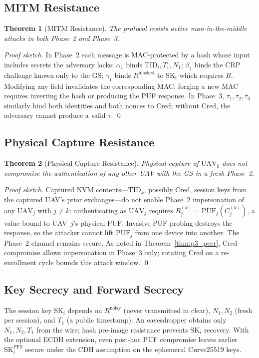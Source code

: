 \documentclass[journal,a4paper,10pt]{IEEEtran}
\newtheorem{theorem}{Theorem}
\begin{document}
\subsection{MITM Resistance}
\begin{theorem}[MITM Resistance]
\label{thm:mitm}
The protocol resists active man-in-the-middle attacks in both
Phase~2 and Phase~3.
\end{theorem}
\begin{proof}[Proof sketch]
In Phase~2 each message is MAC-protected by a hash whose input
includes secrets the adversary lacks: $\alpha_1$ binds
$\mathrm{TID}_i, T_1, N_1$; $\beta_1$ binds the CRP challenge known
only to the GS; $\gamma_1$ binds $R^{\mathrm{masked}}$ to
$\mathrm{SK}_i$ which requires $R$. Modifying any field invalidates
the corresponding MAC; forging a new MAC requires inverting the hash
or producing the PUF response. In Phase~3, $\tau_1, \tau_2, \tau_3$
similarly bind both identities and both nonces to $\mathrm{Cred}$;
without $\mathrm{Cred}$, the adversary cannot produce a valid
$\tau$. \qed
\end{proof}

\subsection{Physical Capture Resistance}
\begin{theorem}[Physical Capture Resistance]
\label{thm:capture}
Physical capture of $\mathrm{UAV}_k$ does not compromise the
authentication of any other UAV with the GS in a fresh Phase~2.
\end{theorem}
\begin{proof}[Proof sketch]
Captured NVM contents---$\mathrm{TID}_k$, possibly $\mathrm{Cred}$,
session keys from the captured UAV's prior exchanges---do not enable
Phase~2 impersonation of any $\mathrm{UAV}_j$ with $j \neq k$:
authenticating as $\mathrm{UAV}_j$ requires
$R_j^{(k)} = \mathrm{PUF}_j(C_j^{(k)})$, a value bound to UAV~$j$'s
physical PUF. Invasive PUF probing destroys the response, so the
attacker cannot lift $\mathrm{PUF}_j$ from one device into
another. The Phase~2 channel remains secure. As noted in
Theorem~\ref{thm:p3_peer}, $\mathrm{Cred}$ compromise allows
impersonation in Phase~3 only; rotating $\mathrm{Cred}$ on a
re-enrollment cycle bounds this attack window. \qed
\end{proof}

\subsection{Key Secrecy and Forward Secrecy}
The session key $\mathrm{SK}_i$ depends on $R^{\mathrm{noisy}}$
(never transmitted in clear), $N_1, N_2$ (fresh per session), and
$T_1$ (a public timestamp). An eavesdropper obtains only
$N_1, N_2, T_1$ from the wire; hash pre-image resistance prevents
$\mathrm{SK}_i$ recovery. With the optional ECDH extension, even
post-hoc PUF compromise leaves earlier $\mathrm{SK}_i^{\mathrm{PFS}}$
secure under the CDH assumption on the ephemeral Curve25519 keys.
\end{document}
